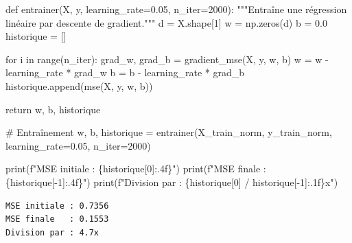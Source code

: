 \documentclass[
  french,
  11pt,
  a4paper,
]{scrbook}
\newenvironment{Shaded}{}{}
\newcommand{\BuiltInTok}[1]{\textcolor[rgb]{0.84,0.23,0.29}{#1}}
\newcommand{\CommentTok}[1]{\textcolor[rgb]{0.42,0.45,0.49}{#1}}
\newcommand{\ControlFlowTok}[1]{\textcolor[rgb]{0.84,0.23,0.29}{#1}}
\newcommand{\DecValTok}[1]{\textcolor[rgb]{0.00,0.36,0.77}{#1}}
\newcommand{\FloatTok}[1]{\textcolor[rgb]{0.00,0.36,0.77}{#1}}
\newcommand{\KeywordTok}[1]{\textcolor[rgb]{0.84,0.23,0.29}{#1}}
\newcommand{\NormalTok}[1]{\textcolor[rgb]{0.14,0.16,0.18}{#1}}
\newcommand{\OperatorTok}[1]{\textcolor[rgb]{0.14,0.16,0.18}{#1}}
\newcommand{\SpecialCharTok}[1]{\textcolor[rgb]{0.00,0.36,0.77}{#1}}
\newcommand{\SpecialStringTok}[1]{\textcolor[rgb]{0.01,0.18,0.38}{#1}}
\begin{document}
\begin{tcolorbox}[enhanced jigsaw, arc=.35mm, bottomrule=.15mm, bottomtitle=1mm, breakable, colback=white, colbacktitle=quarto-callout-tip-color!10!white, colframe=quarto-callout-tip-color-frame, coltitle=black, left=2mm, leftrule=.75mm, opacityback=0, opacitybacktitle=0.6, rightrule=.15mm, title=\textcolor{quarto-callout-tip-color}{\faLightbulb}\hspace{0.5em}{✅ Corrigé Étape 4.4}, titlerule=0mm, toprule=.15mm, toptitle=1mm]

\begin{Shaded}
\begin{Highlighting}[]
\KeywordTok{def}\NormalTok{ entrainer(X, y, learning\_rate}\OperatorTok{=}\FloatTok{0.05}\NormalTok{, n\_iter}\OperatorTok{=}\DecValTok{2000}\NormalTok{):}
    \CommentTok{"""Entraîne une régression linéaire par descente de gradient."""}
\NormalTok{    d }\OperatorTok{=}\NormalTok{ X.shape[}\DecValTok{1}\NormalTok{]}
\NormalTok{    w }\OperatorTok{=}\NormalTok{ np.zeros(d)}
\NormalTok{    b }\OperatorTok{=} \FloatTok{0.0}
\NormalTok{    historique }\OperatorTok{=}\NormalTok{ []}
    
    \ControlFlowTok{for}\NormalTok{ i }\KeywordTok{in} \BuiltInTok{range}\NormalTok{(n\_iter):}
\NormalTok{        grad\_w, grad\_b }\OperatorTok{=}\NormalTok{ gradient\_mse(X, y, w, b)}
\NormalTok{        w }\OperatorTok{=}\NormalTok{ w }\OperatorTok{{-}}\NormalTok{ learning\_rate }\OperatorTok{*}\NormalTok{ grad\_w}
\NormalTok{        b }\OperatorTok{=}\NormalTok{ b }\OperatorTok{{-}}\NormalTok{ learning\_rate }\OperatorTok{*}\NormalTok{ grad\_b}
\NormalTok{        historique.append(mse(X, y, w, b))}
    
    \ControlFlowTok{return}\NormalTok{ w, b, historique}

\CommentTok{\# Entraînement}
\NormalTok{w, b, historique }\OperatorTok{=}\NormalTok{ entrainer(X\_train\_norm, y\_train\_norm, learning\_rate}\OperatorTok{=}\FloatTok{0.05}\NormalTok{, n\_iter}\OperatorTok{=}\DecValTok{2000}\NormalTok{)}

\BuiltInTok{print}\NormalTok{(}\SpecialStringTok{f"MSE initiale : }\SpecialCharTok{\{}\NormalTok{historique[}\DecValTok{0}\NormalTok{]}\SpecialCharTok{:.4f\}}\SpecialStringTok{"}\NormalTok{)}
\BuiltInTok{print}\NormalTok{(}\SpecialStringTok{f"MSE finale   : }\SpecialCharTok{\{}\NormalTok{historique[}\OperatorTok{{-}}\DecValTok{1}\NormalTok{]}\SpecialCharTok{:.4f\}}\SpecialStringTok{"}\NormalTok{)}
\BuiltInTok{print}\NormalTok{(}\SpecialStringTok{f"Division par : }\SpecialCharTok{\{}\NormalTok{historique[}\DecValTok{0}\NormalTok{] }\OperatorTok{/}\NormalTok{ historique[}\OperatorTok{{-}}\DecValTok{1}\NormalTok{]}\SpecialCharTok{:.1f\}}\SpecialStringTok{x"}\NormalTok{)}
\end{Highlighting}
\end{Shaded}

\begin{verbatim}
MSE initiale : 0.7356
MSE finale   : 0.1553
Division par : 4.7x
\end{verbatim}

\end{tcolorbox}
\end{document}
